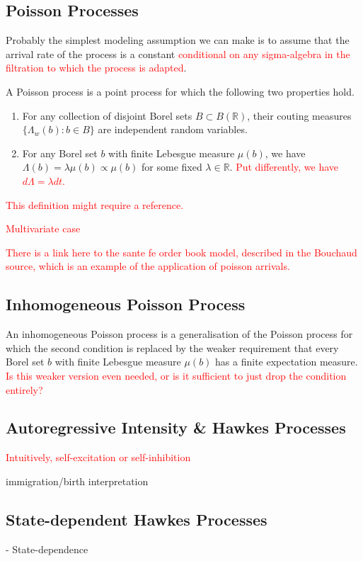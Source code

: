 \documentclass[honours,12pt]{unswthesis}
\numberwithin{equation}{section}
\begin{document}
\subsection{Poisson Processes}
Probably the simplest modeling assumption we can make is to assume that the arrival rate of the process is a constant \textcolor{red}{conditional on any sigma-algebra in the filtration to which the process is adapted}.

A Poisson process is a point process for which the following two properties hold.
\begin{enumerate}
	\item For any collection of disjoint Borel sets $B\subset B(\mathbb R)$, their couting measures $\{\Lambda_w(b) : b\in B\}$ are independent random variables.
	\item For any Borel set $b$ with finite Lebesgue measure $\mu(b)$, we have $\Lambda(b)=\lambda \mu(b)\propto \mu(b)$ for some fixed $\lambda\in\mathbb{R}$. \textcolor{red}{Put differently, we have $d\Lambda=\lambda dt$.}
\end{enumerate}

\textcolor{red}{This definition might require a reference.}

\textcolor{red}{Multivariate case}

\textcolor{red}{There is a link here to the sante fe order book model, described in the Bouchaud source, which is an example of the application of poisson arrivals.}

\subsection{Inhomogeneous Poisson Process}
An inhomogeneous Poisson process is a generalisation of the Poisson process for which the second condition is replaced by the weaker requirement that every Borel set $b$ with finite Lebesgue measure $\mu(b)$ has a finite expectation measure. \textcolor{red}{Is this weaker version even needed, or is it sufficient to just drop the condition entirely?}

\subsection{Autoregressive Intensity \& Hawkes Processes}
\textcolor{red}{Intuitively, self-excitation or self-inhibition}

immigration/birth interpretation

\subsection{State-dependent Hawkes Processes}
- State-dependence
\end{document}
